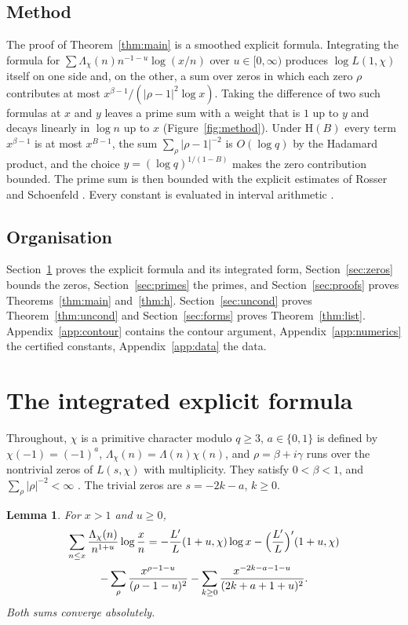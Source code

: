 \documentclass[11pt]{amsart}
\newtheorem{lemma}[theorem]{Lemma}
\theoremstyle{definition}
\theoremstyle{remark}
\newcommand{\Lam}{\Lambda_\chi}
\begin{document}
\subsection*{Method}
The proof of Theorem~\ref{thm:main} is a smoothed explicit formula. Integrating the formula for $\sum\Lam(n)n^{-1-u}\log(x/n)$ over $u\in[0,\infty)$ produces $\log L(1,\chi)$ itself on one side and, on the other, a sum over zeros in which each zero $\rho$ contributes at most $x^{\beta-1}/(|\rho-1|^2\log x)$. Taking the difference of two such formulas at $x$ and $y$ leaves a prime sum with a weight that is $1$ up to $y$ and decays linearly in $\log n$ up to $x$ (Figure~\ref{fig:method}). Under $\mathrm{H}(B)$ every term $x^{\beta-1}$ is at most $x^{B-1}$, the sum $\sum_\rho|\rho-1|^{-2}$ is $O(\log q)$ by the Hadamard product, and the choice $y=(\log q)^{1/(1-B)}$ makes the zero contribution bounded. The prime sum is then bounded with the explicit estimates of Rosser and Schoenfeld \cite{RS62}. Every constant is evaluated in interval arithmetic \cite{Joh17}.

\subsection*{Organisation}
Section~\ref{sec:explicit} proves the explicit formula and its integrated form, Section~\ref{sec:zeros} bounds the zeros, Section~\ref{sec:primes} the primes, and Section~\ref{sec:proofs} proves Theorems~\ref{thm:main} and~\ref{thm:h}. Section~\ref{sec:uncond} proves Theorem~\ref{thm:uncond} and Section~\ref{sec:forms} proves Theorem~\ref{thm:list}. Appendix~\ref{app:contour} contains the contour argument, Appendix~\ref{app:numerics} the certified constants, Appendix~\ref{app:data} the data.

\section{The integrated explicit formula}\label{sec:explicit}

Throughout, $\chi$ is a primitive character modulo $q\ge3$, $a\in\{0,1\}$ is defined by $\chi(-1)=(-1)^a$, $\Lam(n)=\Lambda(n)\chi(n)$, and $\rho=\beta+i\gamma$ runs over the nontrivial zeros of $L(s,\chi)$ with multiplicity. They satisfy $0<\beta<1$, and $\sum_\rho|\rho|^{-2}<\infty$ \cite[Chapter 12]{Dav80}. The trivial zeros are $s=-2k-a$, $k\ge0$.

\begin{lemma}\label{lem:explicit}
For $x>1$ and $u\ge0$,
\begin{multline}\label{eq:explicit}
\sum_{n\le x}\frac{\Lam(n)}{n^{1+u}}\log\frac xn
=-\frac{L'}{L}(1+u,\chi)\log x-\Bigl(\frac{L'}{L}\Bigr)'(1+u,\chi)\\
-\sum_\rho\frac{x^{\rho-1-u}}{(\rho-1-u)^2}
-\sum_{k\ge0}\frac{x^{-2k-a-1-u}}{(2k+a+1+u)^2}.
\end{multline}
Both sums converge absolutely.
\end{lemma}
\end{document}
